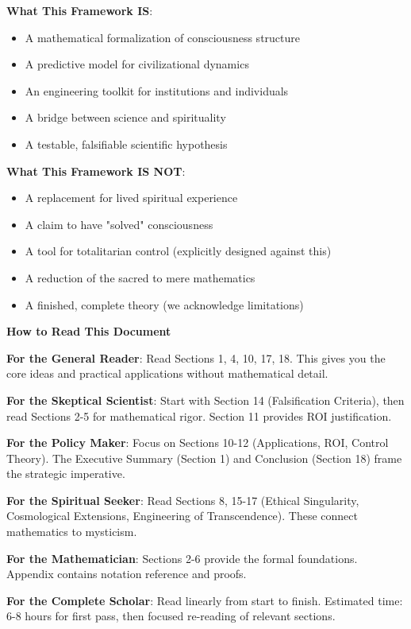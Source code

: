 \documentclass[11pt,a4paper]{article}
\theoremstyle{definition}
\theoremstyle{remark}
\begin{document}
\begin{mdframed}[backgroundcolor=blue!5,linewidth=2pt]
\textbf{What This Framework IS}:
\begin{itemize}[nosep]
    \item A mathematical formalization of consciousness structure
    \item A predictive model for civilizational dynamics
    \item An engineering toolkit for institutions and individuals
    \item A bridge between science and spirituality
    \item A testable, falsifiable scientific hypothesis
\end{itemize}

\vspace{0.5em}

\textbf{What This Framework IS NOT}:
\begin{itemize}[nosep]
    \item A replacement for lived spiritual experience
    \item A claim to have "solved" consciousness
    \item A tool for totalitarian control (explicitly designed against this)
    \item A reduction of the sacred to mere mathematics
    \item A finished, complete theory (we acknowledge limitations)
\end{itemize}
\end{mdframed}

\begin{mdframed}[backgroundcolor=yellow!10,linewidth=2pt]
\textbf{How to Read This Document}

\textbf{For the General Reader}: Read Sections 1, 4, 10, 17, 18. This gives you the core ideas and practical applications without mathematical detail.

\textbf{For the Skeptical Scientist}: Start with Section 14 (Falsification Criteria), then read Sections 2-5 for mathematical rigor. Section 11 provides ROI justification.

\textbf{For the Policy Maker}: Focus on Sections 10-12 (Applications, ROI, Control Theory). The Executive Summary (Section 1) and Conclusion (Section 18) frame the strategic imperative.

\textbf{For the Spiritual Seeker}: Read Sections 8, 15-17 (Ethical Singularity, Cosmological Extensions, Engineering of Transcendence). These connect mathematics to mysticism.

\textbf{For the Mathematician}: Sections 2-6 provide the formal foundations. Appendix contains notation reference and proofs.

\textbf{For the Complete Scholar}: Read linearly from start to finish. Estimated time: 6-8 hours for first pass, then focused re-reading of relevant sections.
\end{mdframed}
\end{document}
